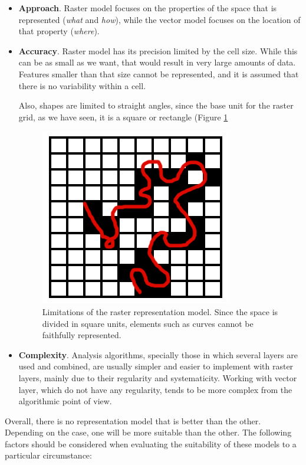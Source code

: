 \begin{itemize}
\item \textbf{Approach}. Raster model focuses on the properties of the space that is represented (\emph{what} and \emph{how}), while the vector model focuses on the location of that property (\emph{where}).
 \item \textbf{Accuracy}. Raster model has its precision limited by the cell size. While this can be as small as we want, that would result in very large amounts of data. Features smaller than that size cannot be represented, and it is assumed that there is no variability within a cell.

 Also, shapes are limited to straight angles, since the base unit for the raster grid, as we have seen, it is a square or rectangle (Figure \ref{Fig:Raster_accuracy}

\begin{figure}[!hbt]   
\centering
\includegraphics[width=.4\columnwidth]{Data/Raster_accuracy.png}
\caption{\small Limitations of the raster representation model. Since the space is divided in square units, elements such as curves cannot be faithfully represented.}
\label{Fig:Raster_accuracy} 
\end{figure}

\item \textbf{Complexity}. Analysis algorithms, specially those in which several layers are used and combined, are usually simpler and easier to implement with raster layers, mainly due to their regularity and systematicity. Working with vector layer, which do not have any regularity, tends to be more complex from the algorithmic point of view.
\end{itemize}

Overall, there is no representation model that is better than the other. Depending on the case, one will be more suitable than the other. The following factors should be considered when evaluating the suitability of these models to a particular circumstance:

